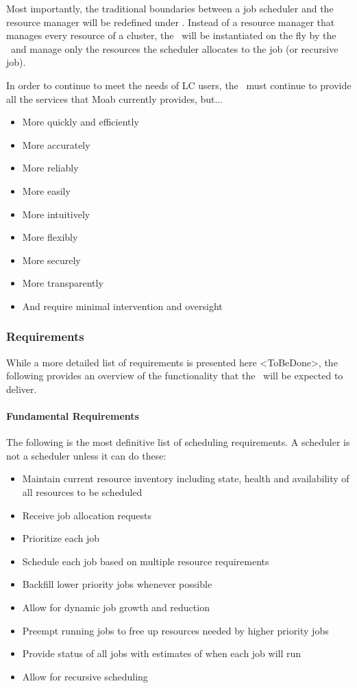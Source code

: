 Most importantly, the traditional boundaries between a job scheduler
and the resource manager will be redefined under \ngrm.  Instead of a
resource manager that manages every resource of a cluster, the
\ngrmfull\ will be instantiated on the fly by the \ngjs\ and manage
only the resources the scheduler allocates to the job (or recursive
job).

In order to continue to meet the needs of LC users, the \ngjs\ must
continue to provide all the services that Moab currently provides,
but...
\begin{itemize}
  \item More quickly and efficiently
  \item More accurately
  \item More reliably
  \item More easily
  \item More intuitively
  \item More flexibly
  \item More securely
  \item More transparently
  \item And require minimal intervention and oversight
\end{itemize}

\subsubsection{Requirements}

While a more detailed list of requirements is presented here
<ToBeDone>, the following provides an overview of the functionality
that the \ngjs\ will be expected to deliver.

\paragraph{Fundamental Requirements}

The following is the most definitive list of scheduling requirements.
A scheduler is not a scheduler unless it can do these:

\begin{itemize}
  \item Maintain current resource inventory including state, health
    and availability of all resources to be scheduled
  \item Receive job allocation requests
  \item Prioritize each job
  \item Schedule each job based on multiple resource requirements
  \item Backfill lower priority jobs whenever possible
  \item Allow for dynamic job growth and reduction
  \item Preempt running jobs to free up resources needed by higher priority jobs
  \item Provide status of all jobs with estimates of when each job will run
  \item Allow for recursive scheduling
\end{itemize}

